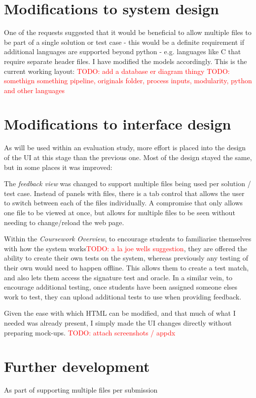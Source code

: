 \documentclass[a4paper,11pt]{report}
\newcommand{\todo}[1]{\textcolor{red}{TODO: #1}}
\begin{document}
\section{Modifications to system design}
One of the requests suggested that it would be beneficial to allow multiple files to be part of a single solution or test case - this would be a definite requirement if additional languages are supported beyond python - e.g. languages like C that require separate header files. I have modified the models accordingly. This is the current working layout:
\todo{add a database er diagram thingy}
\todo{somethign something pipeline, originals folder, process inputs, modularity, python and other languages}

\section{Modifications to interface design}
As will be used within an evaluation study, more effort is placed into the design of the UI at this stage than the previous one. Most of the design stayed the same, but in some places it was improved:\par
The \textit{feedback view} was changed to support multiple files being used per solution / test case. Instead of panels with files, there is a tab control that allows the user to switch between each of the files individually. A compromise that only allows one file to be viewed at once, but allows for multiple files to be seen without needing to change/reload the web page.\par
Within the \textit{Coursework Overview}, to encourage students to familiarise themselves with how the system works\todo{a la joe wells suggestion}, they are offered the ability to create their own tests on the system, whereas previously any testing of their own would need to happen offline. This allows them to create a test match, and also lets them access the signature test and oracle. In a similar vein, to encourage additional testing, once students have been assigned someone elses work to test, they can upload additional tests to use when providing feedback.\par
Given the ease with which HTML can be modified, and that much of what I needed was already present, I simply made the UI changes directly without preparing mock-ups. \todo{attach screenshots / appdx}
\section{Further development}
As part of supporting multiple files per submission
\end{document}
